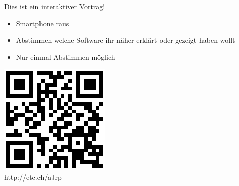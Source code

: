 \begin{frame}{Dies ist ein interaktiver Vortrag!}

\begin{itemize}
\item Smartphone raus
\item Abstimmen welche Software ihr näher erklärt oder gezeigt haben wollt 
\item Nur einmal Abstimmen möglich
\end{itemize}

\begin{center}
\includegraphics[scale=0.6]{images/pollqr} \\
http://etc.ch/aJrp
\end{center}
\end{frame}